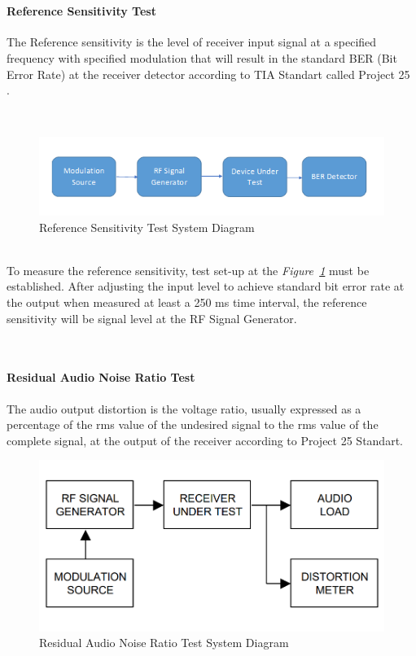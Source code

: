 \- \\

\paragraph{Reference Sensitivity Test}
\- \indent
	The Reference sensitivity is the level of receiver input signal at a specified frequency with specified modulation that will result in the standard BER (Bit Error Rate) at the receiver detector according to TIA Standart called Project 25 \cite{P25}.

\-\\

\begin{figure}[H]
	\center
	\setlength{\unitlength}{\textwidth} 
	\includegraphics[width=1.0\unitlength]{refsens}
	\caption{\label{fig:refsens}Reference Sensitivity Test System Diagram }
\end{figure}

\- \\

	To measure the reference sensitivity, test set-up at the \textit{Figure~\ref{fig:refsens}} must be established. After adjusting the input level to achieve   standard bit error rate at the output when measured at least a 250 ms time interval, the reference sensitivity will be signal level at the RF Signal Generator.

\- \\[1.5cm]

\paragraph{Residual Audio Noise Ratio Test}
\- \indent
	The audio output distortion is the voltage ratio, usually expressed as a percentage of the rms value of the undesired signal to the rms value of the complete signal, at the output of the receiver according to Project 25 Standart\cite{P25}.

\begin{figure}[H]
	\center
	\setlength{\unitlength}{\textwidth} 
	\includegraphics[width=0.75\unitlength]{resaudtest}
	\caption{\label{fig:resaudtest}Residual Audio Noise Ratio Test System Diagram }
\end{figure}

